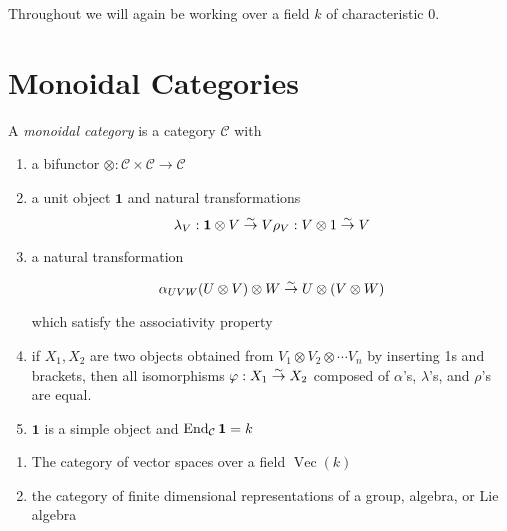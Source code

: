 Throughout we will again be working over a field $k$ of characteristic 0.

\section{Monoidal Categories}
\begin{defn}
    A \emph{monoidal category} is a category $\mathcal{C}$ with 
    \begin{enumerate}
    \renewcommand{\labelenumi}{\roman{enumi})}
        \item a bifunctor $\otimes: \mathcal{C} \times \mathcal{C} \to
            \mathcal{C}$
        \item a unit object $\mathbf{1}$ and natural transformations
            \begin{equation}
                \lambda_V : \mathbf{1} \otimes V \overset{\sim}{\rightarrow} V \\
                \rho_V : V \otimes 1 \overset{\sim}{\rightarrow} V
            \end{equation}
        \item a natural transformation 

            \begin{equation}
                \alpha_{UVW} (U \otimes V) \otimes W \overset{\sim}{\rightarrow} U \otimes (V \otimes W)
            \end{equation}

            which satisfy the associativity property 

        \item if $X_1, X_2$ are two objects obtained from $V_1 \otimes V_2
            \otimes \cdots V_n$ by inserting 1s and brackets, then all
            isomorphisms $\varphi: X_1 \overset{\sim}{\rightarrow} X_2$ composed of $\alpha$'s,
            $\lambda$'s, and $\rho$'s are equal. 
        \item $\mathbf{1}$ is a simple object and $\operatorname{End}_\mathcal{C} \mathbf{1} = k$
    \end{enumerate}

\end{defn}

\begin{example}
    \begin{enumerate}
    \renewcommand{\labelenumi}{\roman{enumi})}
        \item The category of vector spaces over a field $\operatorname{Vec}(k)$
        \item the category of finite dimensional representations of a group, algebra, or Lie algebra
    \end{enumerate}
\end{example}
    
